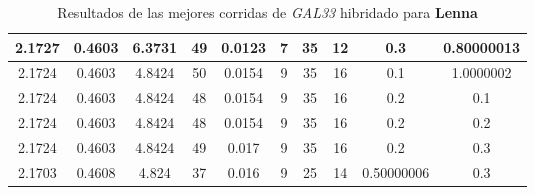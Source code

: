 \begin{table}[h!]
\begin{center}
\begin{tabular}{|c|c|c|c|c|c|c|c|c|c|}
        \hline
            2.1727 & 0.4603  & 6.3731 & 49 & 0.0123 & 7 & 35 & 12 & 0.3 & 0.80000013\\
        \hline
        \hline
            2.1724 & 0.4603  & 4.8424 & 50 & 0.0154 & 9 & 35 & 16 & 0.1 & 1.0000002\\
        \hline
        \hline
            2.1724 & 0.4603  & 4.8424 & 48 & 0.0154 & 9 & 35 & 16 & 0.2 & 0.1\\
        \hline
        \hline
            2.1724 & 0.4603  & 4.8424 & 48 & 0.0154 & 9 & 35 & 16 & 0.2 & 0.2\\
        \hline
        \hline
            2.1724 & 0.4603  & 4.8424 & 49 & 0.017 & 9 & 35 & 16 & 0.2 & 0.3\\
        \hline
        \hline
            2.1703 & 0.4608  & 4.824 & 37 & 0.016 & 9 & 25 & 14 & 0.50000006 & 0.3\\
        \hline
        \end{tabular}
        \caption{Resultados de las mejores corridas de \emph{GAL33} hibridado para {\bf Lenna}}
        \label{tb:tableGAL33}
    \end{center}
\end{table}
